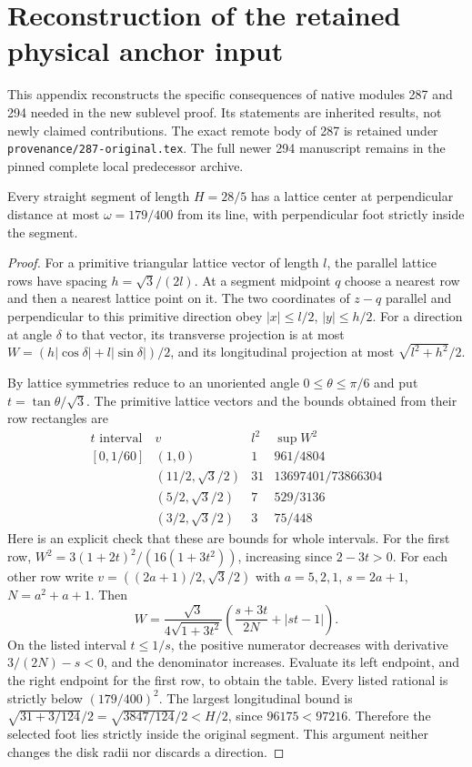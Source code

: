 \section{Reconstruction of the retained physical anchor input}
\label{sec:sc-geometry}
This appendix reconstructs the specific consequences of native modules 287 and 294 needed in the new sublevel proof. Its statements are inherited results, not newly claimed contributions. The exact remote body of 287 is retained under \texttt{provenance/287-original.tex}. The full newer 294 manuscript remains in the pinned complete local predecessor archive.

\begin{sclemma}\label{lem:sc-buffer}
Every straight segment of length $H=28/5$ has a lattice center at perpendicular distance at most $\omega=179/400$ from its line, with perpendicular foot strictly inside the segment.
\end{sclemma}
\begin{proof}
For a primitive triangular lattice vector of length $l$, the parallel lattice rows have spacing $h=\sqrt3/(2l)$. At a segment midpoint $q$ choose a nearest row and then a nearest lattice point on it. The two coordinates of $z-q$ parallel and perpendicular to this primitive direction obey $|x|\le l/2$, $|y|\le h/2$. For a direction at angle $\delta$ to that vector, its transverse projection is at most
$W=(h|\cos\delta|+l|\sin\delta|)/2$, and its longitudinal projection at most $\sqrt{l^2+h^2}/2$.

By lattice symmetries reduce to an unoriented angle $0\le\theta\le\pi/6$ and put $t=\tan\theta/\sqrt3$. The primitive lattice vectors and the bounds obtained from their row rectangles are
\[
\begin{array}{c|c|c|c}
 t\text{ interval}&v&l^2&\sup W^2\\\hline
 [0,1/60]&(1,0)&1&961/4804\\
 [1/60,1/12]&(11/2,\sqrt3/2)&31&13697401/73866304\\
 [1/12,1/5]&(5/2,\sqrt3/2)&7&529/3136\\
 [1/5,1/3]&(3/2,\sqrt3/2)&3&75/448
\end{array}
\]
Here is an explicit check that these are bounds for whole intervals. For the first row,
$W^2=3(1+2t)^2/(16(1+3t^2))$, increasing since $2-3t>0$. For each other row write $v=((2a+1)/2,\sqrt3/2)$ with $a=5,2,1$, $s=2a+1$, $N=a^2+a+1$. Then
\[
 W=\frac{\sqrt3}{4\sqrt{1+3t^2}}
       \left(\frac{s+3t}{2N}+|st-1|\right).
\]
On the listed interval $t\le1/s$, the positive numerator decreases with derivative $3/(2N)-s<0$, and the denominator increases. Evaluate its left endpoint, and the right endpoint for the first row, to obtain the table. Every listed rational is strictly below $(179/400)^2$. The largest longitudinal bound is
$\sqrt{31+3/124}/2=\sqrt{3847/124}/2<H/2$, since $96175<97216$. Therefore the selected foot lies strictly inside the original segment. This argument neither changes the disk radii nor discards a direction.
\end{proof}

